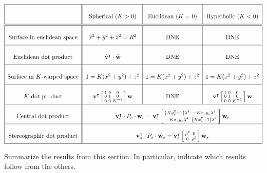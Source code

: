 \documentclass[newpage,hints,12pt,noauthor,nooutcomes]{ximera}
\begin{document}
\[
  {\renewcommand{\arraystretch}{2.7}
  \begin{array}{|c||c|c|c|}\hline
    & \text{Spherical (}K>0) & \text{Euclidean (}K=0) & \text{Hyperbolic (}K<0)\\
    \hline\hline
    \text{Surface in euclidean space}
    & \hat{x}^{2}+\hat{y}^{2}+\hat{z}^{2}=R^{2} & \text{DNE}  & \text{DNE} \\\hline
    \text{Euclidean dot product} & \hat{\mathbf v}^\transpose\cdot \hat{\mathbf w}
                             & \text{DNE}  & \text{DNE}\\\hline
    \text{Surface in $K$-warped space}
    & {1=K(x^{2}+y^{2})+z^{2}} & 1=K(x^{2}+y^{2})+z^{2} & 1=K(x^{2}+y^{2})+z^{2}\\\hline
    K\text{-dot product}
    & \mathbf v^\transpose \left[\begin{smallmatrix}
        1 & 0 & 0\\
        0 & 1 & 0\\
        0 & 0 & K^{-1}
      \end{smallmatrix}\right] \mathbf w &  \text{DNE}
    & \mathbf{v}^\transpose \left[\begin{smallmatrix}1 & 0 & 0\\ 0 & 1 & 0\\ 0 & 0 & K^{-1}\end{smallmatrix}\right]\mathbf w \\\hline
    \text{Central dot product} & \multicolumn{3}{c|}{
        \mathbf{v}_c^\transpose \cdot P_c \cdot \mathbf{w}_c
        = \mathbf{v}_c^\transpose\left[\begin{smallmatrix}
            \left(Ky_c^2+1\right)\lambda^4 & -Kx_{c}y_{c}\lambda^4 \\
            -Kx_{c}y_{c}\lambda^4 & \left(Kx_c^2+1\right)\lambda^4
          \end{smallmatrix}\right] \mathbf{w}_c}\\\hline
    \text{Stereographic dot product} & \multicolumn{3}{c|}{
        \mathbf{v}_s^\transpose\cdot P_s\cdot \mathbf{w}_s
        = \mathbf{v}_s^\transpose\left[\begin{smallmatrix}
            \rho^2 & 0\\ 0 & \rho^2
          \end{smallmatrix}\right] \mathbf{w}_s}\\\hline
\end{array}}
\]





\begin{problem}
Summarize the results from this section. In particular, indicate which
results follow from the others.
\begin{freeResponse}
\end{freeResponse}
\end{problem}
\end{document}
